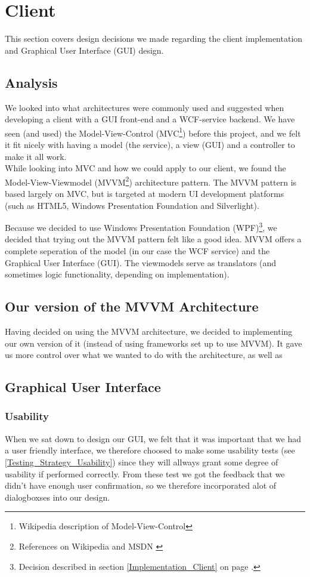 \section{Client}
\label{Design_Client}
This section covers design decisions we made regarding the client implementation and Graphical User Interface (GUI) design.
\subsection{Analysis}
\label{Design_Client_Analysis}
We looked into what architectures were commonly used and suggested when developing a client with a GUI front-end and a WCF-service backend. We have seen (and used) the Model-View-Control (MVC\footnote{Wikipedia description of Model-View-Control\cite{WIKI-MVC}}) before this project, and we felt it fit nicely with having a model (the service), a view (GUI) and a controller to make it all work. 
\\While looking into MVC and how we could apply to our client, we found the Model-View-Viewmodel (MVVM\footnote{References on Wikipedia \cite{WIKI-MVVM} and MSDN \cite{MSDN-WPF-MVVM}}) architecture pattern. The MVVM pattern is based largely on MVC, but is targeted at modern UI development platforms (such as HTML5, Windows Presentation Foundation and Silverlight).

Because we decided to use Windows Presentation Foundation (WPF)\footnote{Decision described in section \ref{Implementation_Client} on page \pageref{Implementation_Client}.}, we decided that trying out the MVVM pattern felt like a good idea. MVVM offers a complete seperation of the model (in our case the WCF service) and the Graphical User Interface (GUI). The viewmodels serve as translators (and sometimes logic functionality, depending on implementation).
\subsection[Architecture]{Our version of the MVVM Architecture}
\label{Design_Client_Architecture}
Having decided on using the MVVM architecture, we decided to implementing our own version of it (instead of using frameworks set up to use MVVM). It gave us more control over what we wanted to do with the architecture, as well as 
\subsection{Graphical User Interface}
\label{Design_Client_GUI}

\subsubsection{Usability}
\label{Design_Client_GUI_Usability}
When we sat down to design our GUI, we felt that it was important that we had a user friendly interface, we therefore choosed to make some usability tests (see \ref{Testing_Strategy_Usability}) since they will allways grant some degree of usability if performed correctly.
From these test we got the feedback that we didn't have enough user confirmation, so we therefore incorporated alot of dialogboxses into our design.

